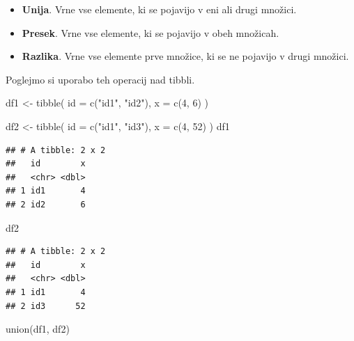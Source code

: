 \documentclass[
]{book}
\newenvironment{Shaded}{\begin{snugshade}}{\end{snugshade}}
\newcommand{\AttributeTok}[1]{\textcolor[rgb]{0.77,0.63,0.00}{#1}}
\newcommand{\DecValTok}[1]{\textcolor[rgb]{0.00,0.00,0.81}{#1}}
\newcommand{\FunctionTok}[1]{\textcolor[rgb]{0.00,0.00,0.00}{#1}}
\newcommand{\NormalTok}[1]{#1}
\newcommand{\OtherTok}[1]{\textcolor[rgb]{0.56,0.35,0.01}{#1}}
\newcommand{\StringTok}[1]{\textcolor[rgb]{0.31,0.60,0.02}{#1}}
\providecommand{\tightlist}{%
  \setlength{\itemsep}{0pt}\setlength{\parskip}{0pt}}
\begin{document}
\begin{itemize}
\tightlist
\item
  \textbf{Unija}. Vrne vse elemente, ki se pojavijo v eni ali drugi množici.
\item
  \textbf{Presek}. Vrne vse elemente, ki se pojavijo v obeh množicah.
\item
  \textbf{Razlika}. Vrne vse elemente prve množice, ki se ne pojavijo v drugi množici.
\end{itemize}

Poglejmo si uporabo teh operacij nad tibbli.

\begin{Shaded}
\begin{Highlighting}[]
\NormalTok{df1 }\OtherTok{\textless{}{-}} \FunctionTok{tibble}\NormalTok{(}
  \AttributeTok{id =} \FunctionTok{c}\NormalTok{(}\StringTok{"id1"}\NormalTok{, }\StringTok{"id2"}\NormalTok{),}
  \AttributeTok{x =} \FunctionTok{c}\NormalTok{(}\DecValTok{4}\NormalTok{, }\DecValTok{6}\NormalTok{)}
\NormalTok{)}

\NormalTok{df2 }\OtherTok{\textless{}{-}} \FunctionTok{tibble}\NormalTok{(}
  \AttributeTok{id =} \FunctionTok{c}\NormalTok{(}\StringTok{"id1"}\NormalTok{, }\StringTok{"id3"}\NormalTok{),}
  \AttributeTok{x =} \FunctionTok{c}\NormalTok{(}\DecValTok{4}\NormalTok{, }\DecValTok{52}\NormalTok{)}
\NormalTok{)}
\NormalTok{df1}
\end{Highlighting}
\end{Shaded}

\begin{verbatim}
## # A tibble: 2 x 2
##   id        x
##   <chr> <dbl>
## 1 id1       4
## 2 id2       6
\end{verbatim}

\begin{Shaded}
\begin{Highlighting}[]
\NormalTok{df2}
\end{Highlighting}
\end{Shaded}

\begin{verbatim}
## # A tibble: 2 x 2
##   id        x
##   <chr> <dbl>
## 1 id1       4
## 2 id3      52
\end{verbatim}

\begin{Shaded}
\begin{Highlighting}[]
\FunctionTok{union}\NormalTok{(df1, df2)}
\end{Highlighting}
\end{Shaded}
\end{document}
